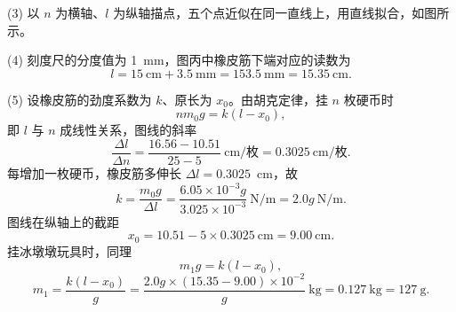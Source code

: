 \begin{answer}
(3) 以 $n$ 为横轴、$l$ 为纵轴描点，五个点近似在同一直线上，用直线拟合，如图所示。


(4) 刻度尺的分度值为 \SI{1}{\milli\metre}，图丙中橡皮筋下端对应的读数为
\[
  l=15~\si{\centi\metre}+3.5~\si{\milli\metre}
   =153.5~\si{\milli\metre}=15.35~\si{\centi\metre}.
\]

(5) 设橡皮筋的劲度系数为 $k$、原长为 $x_{0}$。由胡克定律，挂 $n$ 枚硬币时
\[
  nm_{0}g=k(l-x_{0}),
\]
即 $l$ 与 $n$ 成线性关系，图线的斜率
\[
  \frac{\Delta l}{\Delta n}
  =\frac{16.56-10.51}{25-5}~\si{\centi\metre/\text{枚}}
  =0.3025~\si{\centi\metre/\text{枚}}.
\]
每增加一枚硬币，橡皮筋多伸长 $\Delta l=0.3025$~cm，故
\[
  k=\frac{m_{0}g}{\Delta l}
  =\frac{6.05\times10^{-3}g}{3.025\times10^{-3}}~\si{\newton\per\metre}
  =2.0g~\si{\newton\per\metre}.
\]
图线在纵轴上的截距
\[
  x_{0}=10.51-5\times0.3025~\si{\centi\metre}=9.00~\si{\centi\metre}.
\]
挂冰墩墩玩具时，同理
\[
  m_{1}g=k(l-x_{0}),
\]
\[
  m_{1}=\frac{k(l-x_{0})}{g}
  =\frac{2.0g\times(15.35-9.00)\times10^{-2}}{g}~\si{\kilo\gram}
  =0.127~\si{\kilo\gram}=127~\si{\gram}.
\]
\end{answer}

